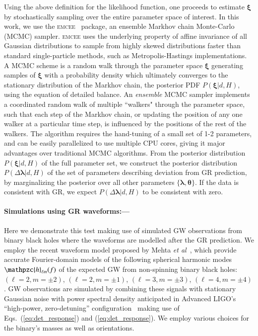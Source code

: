 \documentclass[prl,preprintnumbers,twocolumn,eqsecnum,floatfix,a4paper,nofootinbib,superscriptaddress]{revtex4}
\newcommand{\h}{\mathpzc{h}}
\newcommand{\blambda}{\bm{\lambda}}
\newcommand{\btheta}{\bm{\theta}}
\newcommand{\bxi}{\bm{\xi}}
\newcommand{\etal}{\emph{et al}}
\begin{document}
Using the above definition for the likelihood function, one proceeds to estimate $\bxi$ by stochastically sampling over the entire parameter space of interest. In this work, we use the \textsc{emcee}~\cite{goodman2010ensemble,foreman2013emcee} package, an ensemble Markhov chain Monte-Carlo (MCMC) sampler. \textsc{emcee} uses the underlying property of affine invariance of all Gaussian distributions to sample from highly skewed distributions faster than standard single-particle methods, such as Metropolis-Hastings implementations. A MCMC scheme is a random walk through the parameter space $\bxi$ generating samples of $\bxi$ with a probability density which ultimately converges to the stationary distribution of the Markhov chain, the posterior PDF $P(\bxi|d, H)$, using the equation of detailed balance. An \emph{ensemble} MCMC sampler implements a coordinated random walk of multiple ``walkers" through the parameter space, such that each step of the Markhov chain, or updating the position of any one walker at a particular time step, is influenced by the positions of the rest of the walkers. The algorithm requires the hand-tuning of a small set of 1-2 parameters, and can be easily parallelized to use multiple CPU cores, giving it major advantages over traditional MCMC algorithms. From the posterior distribution $P(\bxi | d, H)$ of the full parameter set, we construct the posterior distribution $P(\Delta \blambda | d, H)$ of the set of parameters describing deviation from GR prediction, by marginalizing the posterior over all other parameters $\{\blambda, \btheta\}$. If the data is consistent with GR, we expect $P(\Delta \blambda | d, H)$ to be consistent with zero. 

\paragraph{Simulations using GR waveforms:---}
Here we demonstrate this test making use of simulated GW observations from binary black holes where the waveforms are modelled after the GR prediction. We employ the recent waveform model proposed by Mehta \etal~\cite{Mehta:2017jpq}, which provide accurate Fourier-domain models of the following spherical harmonic modes $\h_{\ell m}(f)$ of the expected GW from non-spinning binary black holes: $(\ell = 2, m = \pm2)$, $(\ell = 2, m=\pm1)$, $(\ell = 3, m=\pm3)$, $(\ell = 4, m = \pm4)$. GW observations are simulated by combining these signals with stationary Gaussian noise with power spectral density anticipated in Advanced LIGO's ``high-power, zero-detuning'' configuration~\cite{aLIGOZeroDetHighPower} making use of Eqs.~(\ref{eq:det_response}) and (\ref{eq:det_response}). We employ various choices for the binary's masses as well as orientations. 
 
\end{document}
